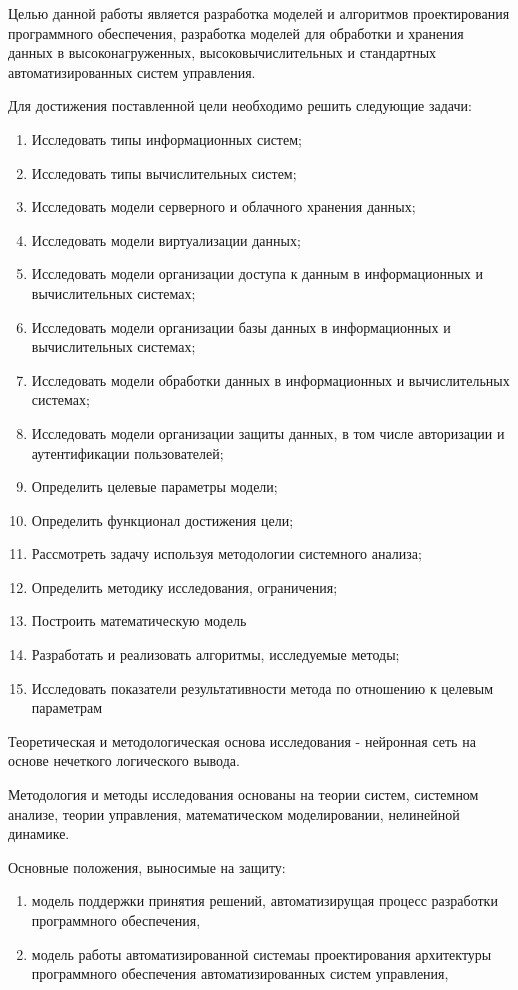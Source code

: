 Целью данной работы является разработка моделей и алгоритмов проектирования программного обеспечения, разработка моделей для обработки и хранения данных в высоконагруженных, высоковычислительных и стандартных  автоматизированных систем управления.

Для достижения поставленной цели необходимо решить следующие задачи:
\begin{enumerate}
\item Исследовать типы информационных систем;
\item Исследовать типы вычислительных систем;
\item Исследовать модели серверного и облачного хранения данных;
\item Исследовать модели виртуализации данных;
\item Исследовать модели организации доступа к данным в информационных и вычислительных системах;
\item Исследовать модели организации базы данных в информационных и вычислительных системах;
\item Исследовать модели обработки данных в информационных и вычислительных системах;
\item Исследовать модели организации защиты данных, в том числе авторизации и аутентификации пользователей;
\item Определить целевые параметры модели;
\item Определить функционал достижения цели;
\item Рассмотреть задачу используя методологии системного анализа;
\item Определить методику исследования, ограничения;
\item Построить математическую модель
\item Разработать и реализовать алгоритмы, исследуемые методы;
\item Исследовать показатели результативности метода по отношению к целевым параметрам
\end{enumerate}

Теоретическая и методологическая основа исследования - нейронная сеть на основе нечеткого логического вывода.

Методология и методы исследования основаны на теории систем, системном анализе, теории управления, математическом моделировании, нелинейной динамике.

Основные положения, выносимые на защиту:
\begin{enumerate}
\item модель поддержки принятия решений, автоматизирущая процесс разработки программного обеспечения,
\item модель работы автоматизированной системаы проектирования архитектуры программного обеспечения автоматизированных систем управления,
\end{enumerate}



